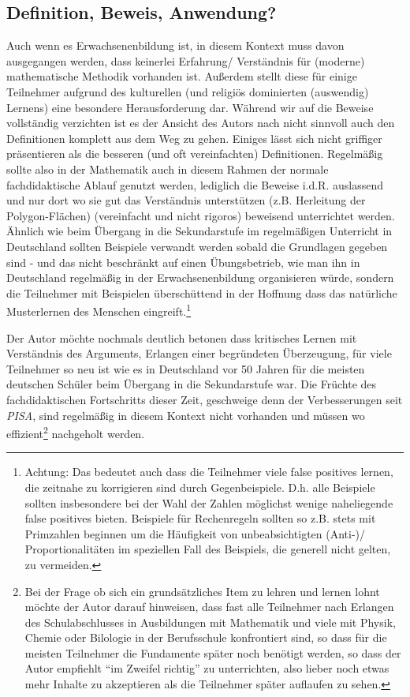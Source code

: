 \documentclass[a4paper]{book}%
\theoremstyle{definition}
\begin{document}
\subsection{Definition, Beweis, Anwendung?}

Auch wenn es Erwachsenenbildung ist, in diesem Kontext muss davon ausgegangen werden, dass keinerlei Erfahrung/ Verständnis für (moderne) mathematische Methodik vorhanden ist. Außerdem stellt diese für einige Teilnehmer aufgrund des kulturellen (und religiös dominierten (auswendig) Lernens) eine besondere Herausforderung dar. Während wir auf die Beweise vollständig verzichten ist es der Ansicht des Autors nach nicht sinnvoll auch den Definitionen komplett aus dem Weg zu gehen. Einiges lässt sich nicht griffiger präsentieren als die besseren (und oft vereinfachten) Definitionen. Regelmäßig sollte also in der Mathematik auch in diesem Rahmen der normale fachdidaktische Ablauf genutzt werden, lediglich die Beweise i.d.R. auslassend und nur dort wo sie gut das Verständnis unterstützen (z.B. Herleitung der Polygon-Flächen) (vereinfacht und nicht rigoros) beweisend unterrichtet werden. Ähnlich wie beim Übergang in die Sekundarstufe im regelmäßigen Unterricht in Deutschland sollten Beispiele verwandt werden sobald die Grundlagen gegeben sind - und das nicht beschränkt auf einen Übungsbetrieb, wie man ihn in Deutschland regelmäßig in der Erwachsenenbildung organisieren würde, sondern die Teilnehmer mit Beispielen überschüttend in der Hoffnung dass das natürliche Musterlernen des Menschen eingreift.\footnote{Achtung: Das bedeutet auch dass die Teilnehmer viele false positives lernen, die zeitnahe zu korrigieren sind durch Gegenbeispiele. D.h. alle Beispiele sollten insbesondere bei der Wahl der Zahlen möglichst wenige naheliegende false positives bieten. Beispiele für Rechenregeln sollten so z.B. stets mit Primzahlen beginnen um die Häufigkeit von unbeabsichtigten (Anti-)/ Proportionalitäten im speziellen Fall des Beispiels, die generell nicht gelten, zu vermeiden.}

Der Autor möchte nochmals deutlich betonen dass kritisches Lernen mit Verständnis des Arguments, Erlangen einer begründeten Überzeugung, für viele Teilnehmer so neu ist wie es in Deutschland vor 50 Jahren für die meisten deutschen Schüler beim Übergang in die Sekundarstufe war. Die Früchte des fachdidaktischen Fortschritts dieser Zeit, geschweige denn der Verbesserungen seit \textit{PISA}, sind regelmäßig in diesem Kontext nicht vorhanden und müssen wo effizient\footnote{Bei der Frage ob sich ein grundsätzliches Item zu lehren und lernen lohnt möchte der Autor darauf hinweisen, dass fast alle Teilnehmer nach Erlangen des Schulabschlusses in Ausbildungen mit Mathematik und viele mit Physik, Chemie oder Bilologie in der Berufsschule konfrontiert sind, so dass für die meisten Teilnehmer die Fundamente später noch benötigt werden, so dass der Autor empfiehlt \enquote{im Zweifel richtig} zu unterrichten, also lieber noch etwas mehr Inhalte zu akzeptieren als die Teilnehmer später auflaufen zu sehen.} nachgeholt werden.
\end{document}
